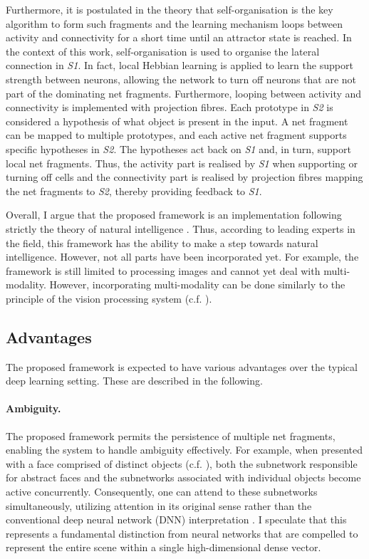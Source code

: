 Furthermore, it is postulated in the theory that self-organisation is the key algorithm to form such fragments and the learning mechanism loops between activity and connectivity for a short time until an attractor state is reached.
In the context of this work, self-organisation is used to organise the lateral connection in \emph{S1}. In fact, local Hebbian learning is applied to learn the support strength between neurons, allowing the network to turn off neurons that are not part of the dominating net fragments.
Furthermore, looping between activity and connectivity is implemented with projection fibres. 
Each prototype in \emph{S2} is considered a hypothesis of what object is present in the input. A net fragment can be mapped to multiple prototypes, and each active net fragment supports specific hypotheses in \emph{S2}. The hypotheses act back on \emph{S1} and, in turn, support local net fragments. Thus, the activity part is realised by \emph{S1} when supporting or turning off cells and the connectivity part is realised by projection fibres mapping the net fragments to \emph{S2}, thereby providing feedback to \emph{S1}.

Overall, I argue that the proposed framework is an implementation following strictly the theory of natural intelligence \cite{von_der_malsburg_theory_2022}. Thus, according to leading experts in the field, this framework has the ability to make a step towards natural intelligence. However, not all parts have been incorporated yet. For example, the framework is still limited to processing images and cannot yet deal with multi-modality. However, incorporating multi-modality can be done similarly to the principle of the vision processing system (c.f. ).


\subsection{Advantages}
The proposed framework is expected to have various advantages over the typical deep learning setting. These are described in the following.

\paragraph{Ambiguity.} The proposed framework permits the persistence of multiple net fragments, enabling the system to handle ambiguity effectively. For example, when presented with a face comprised of distinct objects (c.f. ), both the subnetwork responsible for abstract faces and the subnetworks associated with individual objects become active concurrently. Consequently, one can attend to these subnetworks simultaneously, utilizing attention in its original sense rather than the conventional deep neural network (DNN) interpretation . I speculate that this represents a fundamental distinction from neural networks that are compelled to represent the entire scene within a single high-dimensional dense vector.


